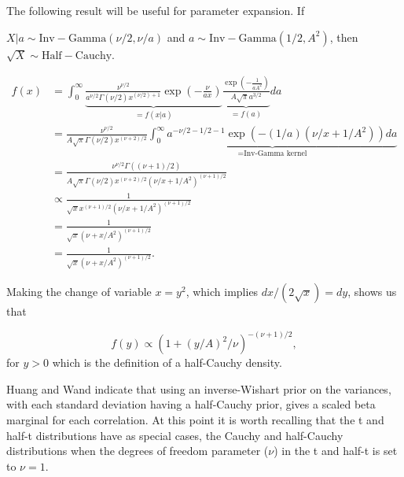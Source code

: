 The following result will be useful for parameter expansion. If 

$X\vert a \sim \mathrm{Inv-Gamma}(\nu/2, \nu/a)$ and  $a \sim \mathrm{Inv-Gamma}(1/2,A^2)$, then $\sqrt{X}\sim \mathrm{Half-Cauchy}$. 

\begin{align*}
f(x) &= \int_0^\infty \underbrace{  \frac{\nu^{\nu/2}}{a^{\nu/2}\Gamma(\nu/2)x^{(\nu/2)+1}}\exp{(-\frac{\nu}{ax})}   }_{=f(x\vert a)} \underbrace{\frac{\exp{(-\frac{1}{aA^2})}}{A\sqrt{\pi}a^{3/2}}}_{=f(a)} da\\
&=\frac{\nu^{\nu/2}}{A\sqrt{\pi}\Gamma(\nu/2)x^{(\nu+2)/2}}\underbrace{\int_0^\infty a^{-\nu/2-1/2-1}\exp{(-(1/a)(\nu/x+1/A^2))}da}_{=\text{Inv-Gamma kernel}}\\
&=\frac{\nu^{\nu/2}\Gamma((\nu+1)/2)}{A\sqrt{\pi}\Gamma(\nu/2)x^{(\nu+2)/2}(\nu/x+1/A^2)^{(\nu+1)/2}}\\
&\propto \frac{1}{\sqrt{x}x^{(\nu+1)/2}(\nu/x+1/A^2)^{(\nu+1)/2}}\\
& =\frac{1}{\sqrt{x}(\nu+x/A^2)^{(\nu+1)/2}  }\\
&=\frac{1}{\sqrt{x}(\nu+x/A^2)^{(\nu+1)/2}  }.
\end{align*}

Making the change of variable $x=y^2$, which implies $dx/(2\sqrt{x})=dy$, shows us that 

\begin{equation}
f(y) \propto (1+(y/A)^2/\nu)^{-(\nu+1)/2},
\end{equation}
for $y>0$ which is the definition of a half-Cauchy density. 

Huang and Wand \cite{huang2013simple} indicate that using an inverse-Wishart prior on the variances, with each standard deviation having a half-Cauchy prior, gives a scaled beta marginal for each correlation. At this point it is worth recalling that the t and half-t distributions have as special cases, the Cauchy and half-Cauchy distributions when the degrees of freedom parameter ($\nu$) in the t and half-t is set to $\nu=1$. 

